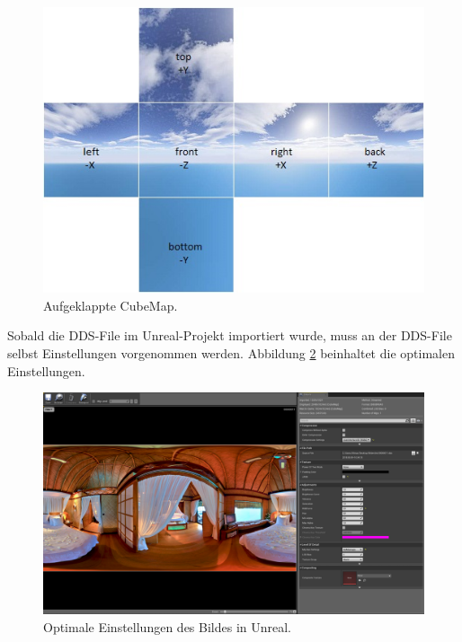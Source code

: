 \begin{figure}[H] \centering
\includegraphics[width=\textwidth]{Images/cubemap.png} 
\caption[Aufgeklappte CubeMap]{Aufgeklappte CubeMap\cite{belanec19}.}
\label{fig-cubemap} 
\end{figure}


Sobald die DDS-File im Unreal-Projekt importiert wurde, muss an der DDS-File selbst Einstellungen vorgenommen werden. 
Abbildung \ref{fig-einstellungen} beinhaltet die optimalen Einstellungen. \\

\begin{figure}[H] \centering
\includegraphics[width=\textwidth]{Images/einstellungen.png} 
\caption{Optimale Einstellungen des Bildes in Unreal.}
\label{fig-einstellungen} 
\end{figure}


